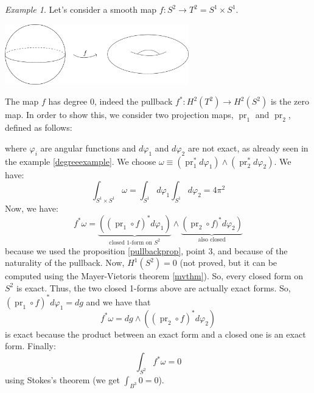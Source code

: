 \documentclass[a4paper,11pt,titlepage, article, oneside]{memoir}
\numberwithin{equation}{section}
\theoremstyle{definition}
\theoremstyle{remark}
\newtheorem{example}[theorem]{Example}
\DeclareMathOperator{\pr}{pr}
\begin{document}
\begin{tcolorbox}
\begin{example}
Let's consider a smooth map $f \colon S^2 \rightarrow T^2=S^1 \times S^1$.
\begin{minipage}{\textwidth} \label{Fig:torus}
\vspace{1em}
     \centering
     \includegraphics[width=0.6\textwidth]{Images/torus.pdf}
\end{minipage}
The map $f$ has degree 0, indeed the pullback $f^*\colon H^2(T^2) \rightarrow H^2(S^2)$ is the zero map. In order to show this, we consider two projection maps, $\pr_1$ and $\pr_2$, defined as follows:
\begin{center}
\end{center}
where  $\varphi_i$ are angular functions and $d\varphi_1$ and $d\varphi_2$ are not exact, as already seen in the example \ref{degreeexample}.
We choose $\omega \equiv (\pr_1^* d \varphi_1) \wedge (\pr_2^* d\varphi_2)$. We have:
$$\int_{S^1 \times S^1} \omega = \int_{S^1} d\varphi_1 \int_{S^1} d\varphi_2 = 4 \pi^2$$
Now, we have:
$$f^* \omega = \underbrace{\left ( (\pr_1 \circ f)^* d \varphi_1 \right )}_{\text{closed 1-form on }S^2} \wedge \underbrace{\left( \pr_2 \circ f)^* d \varphi_2 \right)}_{\text{also closed}}$$
 because we used the proposition \ref{pullbackprop}, point 3, and because of the naturality of the pullback. Now, $H^1(S^2)=0$ (not proved, but it can be computed using the Mayer-Vietoris theorem \ref{mvthm}). So, every closed form on $S^2$ is exact. Thus, the two closed 1-forms above are actually exact forms.
So, $(\pr_1\circ f)^*d\varphi_1 = d g$ and we have that
$$f^*\omega = dg \wedge \left( (\pr_2 \circ f)^* d \varphi_2 \right)$$ is exact because the product between an exact form  and a closed one is an exact form. Finally:
$$\int_{S^2} f^* \omega = 0$$
using Stokes's theorem (we get $\int_{B^3} 0=0$).
\end{example}
\end{tcolorbox}
\end{document}
